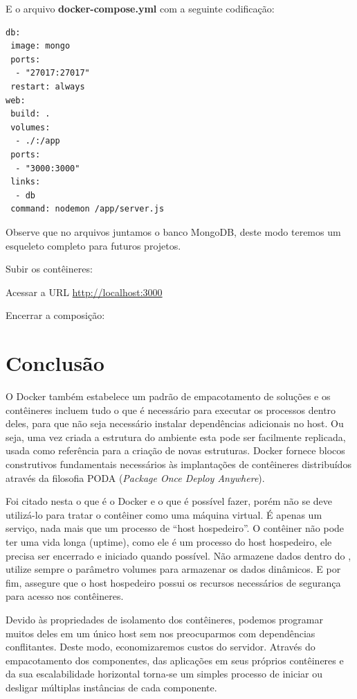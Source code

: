 \documentclass[a4paper,11pt]{article}
\begin{document}
E o arquivo \textbf{docker-compose.yml} com a seguinte codificação:
\begin{lstlisting}
db:
 image: mongo
 ports:
  - "27017:27017"
 restart: always
web:
 build: .
 volumes:
  - ./:/app
 ports:
  - "3000:3000"
 links:
  - db
 command: nodemon /app/server.js
\end{lstlisting}

Observe que no arquivos juntamos o banco MongoDB, deste modo teremos um esqueleto completo para futuros projetos. 

Subir os contêineres: \\

Acessar a URL \url{http://localhost:3000}

Encerrar a composição: \\

\section{Conclusão}
O Docker também estabelece um padrão de empacotamento de soluções e os contêineres incluem tudo o que é necessário para executar os processos dentro deles, para que não seja necessário instalar dependências adicionais no host. Ou seja, uma vez criada a estrutura do ambiente esta pode ser facilmente replicada, usada como referência para a criação de novas estruturas. Docker fornece blocos construtivos fundamentais necessários às implantações de contêineres distribuídos através da filosofia PODA (\textit{Package Once Deploy Anywhere}).

Foi citado nesta o que é o Docker e o que é possível fazer, porém não se deve utilizá-lo para tratar o contêiner como uma máquina virtual. É apenas um serviço, nada mais que um processo de ``host hospedeiro''. O contêiner não pode ter uma vida longa (uptime), como ele é um processo do host hospedeiro, ele precisa ser encerrado e iniciado quando possível. Não armazene dados dentro do , utilize sempre o parâmetro volumes para armazenar os dados dinâmicos. E por fim, assegure que o host hospedeiro possui os recursos necessários de segurança para acesso nos contêineres.

Devido às propriedades de isolamento dos contêineres, podemos programar muitos deles em um único host sem nos preocuparmos com dependências conflitantes. Deste modo, economizaremos custos do servidor. Através do empacotamento dos componentes, das aplicações em seus próprios contêineres e da sua escalabilidade horizontal torna-se um simples processo de iniciar ou desligar múltiplas instâncias de cada componente. 
\end{document}
